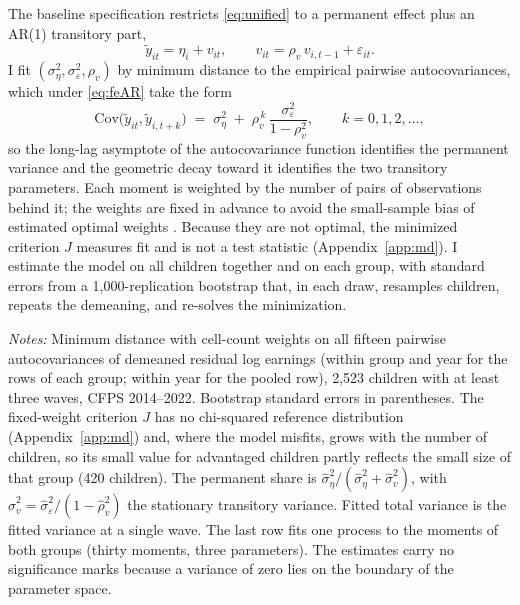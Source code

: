 \documentclass[11pt]{article}
\begin{document}
The baseline specification restricts \eqref{eq:unified} to a permanent
effect plus an AR(1) transitory part,
\begin{equation}
\tilde y_{it} = \eta_i + v_{it}, \qquad
v_{it} = \rho_v\, v_{i,t-1} + \varepsilon_{it}.
\label{eq:feAR}
\end{equation}
I fit $(\sigma^2_\eta, \sigma^2_\varepsilon, \rho_v)$ by minimum
distance to the empirical pairwise autocovariances, which
under \eqref{eq:feAR} take the form
\begin{equation}
\mathrm{Cov}\big(\tilde y_{it}, \tilde y_{i,t+k}\big)
\;=\; \sigma^2_\eta \;+\; \rho_v^{\,k}\,
\frac{\sigma^2_\varepsilon}{1-\rho_v^2},
\qquad k = 0, 1, 2, \dots,
\label{eq:moments}
\end{equation}
so the long-lag asymptote of the autocovariance function identifies
the permanent variance and the geometric decay toward it identifies the two transitory parameters. Each moment is weighted by the number of pairs of observations behind it; the weights are fixed in advance to avoid the small-sample bias of estimated optimal weights \citep{AltonjiSegal1996}. Because they are not optimal, the minimized criterion $J$ measures fit and is not a test statistic (Appendix~\ref{app:md}). I estimate the model on all children together and on each group, with standard errors from a 1,000-replication bootstrap that, in each draw, resamples children, repeats the demeaning, and re-solves the minimization.

\begin{table}[t]
\centering
\small
\caption{Permanent--transitory decomposition of residual log earnings.}
\label{tab:md}

\par\smallskip
\begin{minipage}{0.92\textwidth}
\footnotesize\emph{Notes:} Minimum distance with cell-count weights on
all fifteen pairwise autocovariances of demeaned residual log earnings
(within group and year for the rows of each group; within year for the pooled row), 2,523 children with at least three waves, CFPS 2014--2022. Bootstrap standard errors in parentheses. The fixed-weight criterion $J$ has no chi-squared reference distribution (Appendix~\ref{app:md}) and, where the model misfits, grows with the number of children, so its small value for advantaged children partly reflects the small size of that group (420 children). The permanent share is $\hat\sigma^2_\eta / (\hat\sigma^2_\eta + \hat\sigma^2_v)$, with $\hat\sigma^2_v = \hat\sigma^2_\varepsilon/(1 - \hat\rho_v^2)$ the stationary transitory variance. Fitted total variance is the fitted
variance at a single wave.
The last row fits one process to the moments of both groups (thirty moments, three parameters). The estimates carry no significance marks because a variance of zero lies on the boundary of the parameter space.
\end{minipage}
\end{table}
\end{document}
